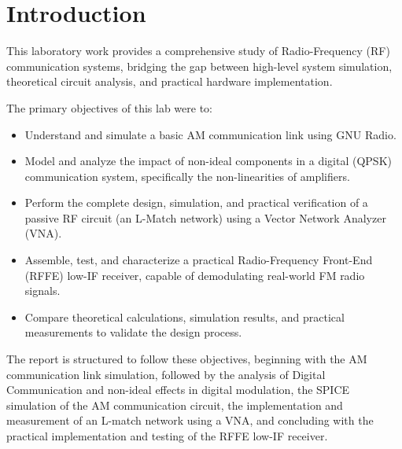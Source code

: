 \section{Introduction}

This laboratory work provides a comprehensive study of Radio-Frequency (RF) communication systems, bridging the gap between high-level system simulation, theoretical circuit analysis, and practical hardware implementation.

The primary objectives of this lab were to:
\begin{itemize}
    \item Understand and simulate a basic AM communication link using GNU Radio.
    \item Model and analyze the impact of non-ideal components in a digital (QPSK) communication system, specifically the non-linearities of amplifiers.
    \item Perform the complete design, simulation, and practical verification of a passive RF circuit (an L-Match network) using a Vector Network Analyzer (VNA).
    \item Assemble, test, and characterize a practical Radio-Frequency Front-End (RFFE) low-IF receiver, capable of demodulating real-world FM radio signals.
    \item Compare theoretical calculations, simulation results, and practical measurements to validate the design process.
\end{itemize}

The report is structured to follow these objectives, beginning with the AM communication link simulation, followed by the analysis of Digital Communication and non-ideal effects in digital modulation, the SPICE simulation of the AM communication circuit, the implementation and measurement of an L-match network using a VNA, and concluding with the practical implementation and testing of the RFFE low-IF receiver.

